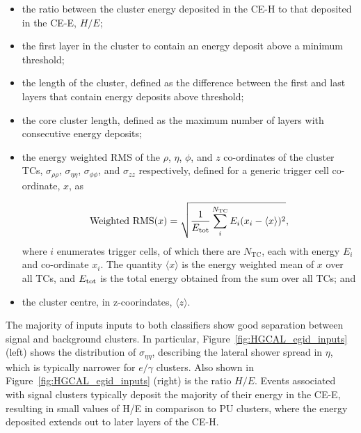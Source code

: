 \begin{itemize}
    \item the ratio between the cluster energy deposited in the CE-H to that deposited in the CE-E, $H/E$; %
    \item the first layer in the cluster to contain an energy deposit above a minimum threshold;%
    \item the length of the cluster, defined as the difference between the first and last layers that contain energy deposits above threshold; %
    \item the core cluster length, defined as the maximum number of layers with consecutive energy deposits; %
    \item the energy weighted RMS of the $\rho$, $\eta$, $\phi$, and $z$ co-ordinates of the cluster TCs, $\sigma_{\rho\rho}$,  $\sigma_{\eta\eta}$, $\sigma_{\phi\phi}$, and $\sigma_{zz}$ respectively, defined for a generic trigger cell co-ordinate, $x$, as
    
    \begin{equation}
            {\rm{Weighted}\,\,\rm{RMS}}(x) = \sqrt{\frac{1}{E_{\rm{tot}}}\sum^{N_{\rm{TC}}}_{i} E_i (x_i-\langle x \rangle)^2},
    \end{equation}
    where $i$ enumerates trigger cells, of which there are $N_{\mathrm{TC}}$, each with energy $E_i$ and co-ordinate $x_i$. The quantity $\langle x \rangle$ is the energy weighted mean of $x$ over all TCs, and $E_{\rm{tot}}$ is the total energy obtained from the sum over all TCs; and %
    \item the cluster centre, in z-coorindates, $\langle z \rangle$. %
\end{itemize}

\noindent The majority of inputs inputs to both classifiers show good separation between signal and background clusters. In particular, Figure~\ref{fig:HGCAL_egid_inputs} (left) shows the distribution of $\sigma_{\eta\eta}$, describing the lateral shower spread in $\eta$, which is typically narrower for $e/\gamma$ clusters. Also shown in Figure~\ref{fig:HGCAL_egid_inputs} (right) is the ratio $H/E$. Events associated with signal clusters typically deposit the majority of their energy in the CE-E, resulting in small values of H/E in comparison to PU clusters, where the energy deposited extends out to later layers of the CE-H.

